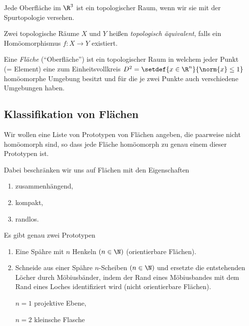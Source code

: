 \begin{propn}
Jede Oberfläche im $\R^3$ ist ein topologischer Raum, wenn wir sie mit der
Spurtopologie versehen.\fishhere
\end{propn}

\begin{defn}
\label{prop:0.3.7}
Zwei topologische Räume $X$ und $Y$ heißen \emph{topologisch äquivalent}, falls
ein Homöomorphismus $f: X\to Y$ existiert.\fishhere
\end{defn}

\begin{defn}
\label{prop:0.3.8}
Eine \emph{Fläche} (``Oberfläche'') ist ein topologischer Raum in welchem jeder
Punkt (= Element) eine zum Einheitsvollkreis $D^2 = \setdef{x\in\R^n}{\norm{x} \le
1}$ homöomorphe Umgebung besitzt und für die je zwei Punkte auch verschiedene
Umgebungen haben.\fishhere
\end{defn}

\subsection{Klassifikation von Flächen}
\label{subsec:0.4}

Wir wollen eine Liste von Prototypen von Flächen angeben, die paarweise nicht
homöomorph sind, so dass jede Fläche homöomorph zu genau einem dieser
Prototypen ist.

Dabei beschränken wir uns auf Flächen mit den Eigenschaften
\begin{enumerate}
  \item zusammenhängend,
  \item kompakt,
  \item randlos.
\end{enumerate}

Es gibt genau zwei Prototypen

\begin{enumerate}[label=\arabic{*}. Typ]
  \item Eine Spähre mit $n$ Henkeln $(n\in\N)$
  (orientierbare Flächen).
  \item Schneide aus einer Spähre $n$-Scheiben $(n\in\N)$ und
  ersetzte die entstehenden Löcher durch Möbiusbänder, indem der Rand eines Möbiusbandes mit
  dem Rand eines Loches identifiziert wird (nicht orientierbare Flächen).
  
  $n=1$ projektive Ebene,
  
  $n=2$ kleinsche Flasche
\end{enumerate}

